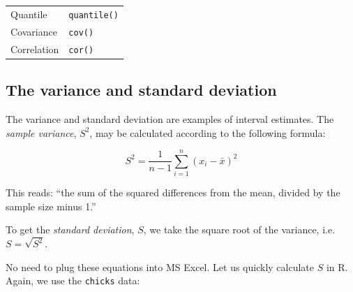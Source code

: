 \documentclass[english,10pt,a4paper,oneside]{book}
\newenvironment{Shaded}{\begin{snugshade}}{\end{snugshade}}
\newcommand{\DataTypeTok}[1]{\textcolor[rgb]{0.13,0.29,0.53}{#1}}
\newcommand{\KeywordTok}[1]{\textcolor[rgb]{0.13,0.29,0.53}{\textbf{#1}}}
\newcommand{\NormalTok}[1]{#1}
\newcommand{\OperatorTok}[1]{\textcolor[rgb]{0.81,0.36,0.00}{\textbf{#1}}}
\newcommand{\StringTok}[1]{\textcolor[rgb]{0.31,0.60,0.02}{#1}}
\theoremstyle{definition}
\theoremstyle{definition}
\theoremstyle{definition}
\theoremstyle{remark}
\begin{document}
\begin{longtable}[]{@{}ll@{}}
\begin{minipage}[t]{0.29\columnwidth}
Quantile\strut
\end{minipage} & \begin{minipage}[t]{0.29\columnwidth}\raggedright
\texttt{quantile()}\strut
\end{minipage}\tabularnewline
\begin{minipage}[t]{0.29\columnwidth}\raggedright
Covariance\strut
\end{minipage} & \begin{minipage}[t]{0.29\columnwidth}\raggedright
\texttt{cov()}\strut
\end{minipage}\tabularnewline
\begin{minipage}[t]{0.29\columnwidth}\raggedright
Correlation\strut
\end{minipage} & \begin{minipage}[t]{0.29\columnwidth}\raggedright
\texttt{cor()}\strut
\end{minipage}\tabularnewline
\bottomrule
\end{longtable}

\hypertarget{the-variance-and-standard-deviation}{%
\subsection{The variance and standard
deviation}\label{the-variance-and-standard-deviation}}

The variance and standard deviation are examples of interval estimates.
The \emph{sample variance}, \(S^{2}\), may be calculated according to
the following formula:

\[S^{2} = \frac{1}{n-1}\sum_{i=1}^{n}(x_{i}-\bar{x})^{2}\]

This reads: \enquote{the sum of the squared differences from the mean,
divided by the sample size minus 1.}

To get the \emph{standard deviation}, \(S\), we take the square root of
the variance, i.e. \(S = \sqrt{S^{2}}\).

No need to plug these equations into MS Excel. Let us quickly calculate
\(S\) in R. Again, we use the \texttt{chicks} data:

\begin{Shaded}
\end{Shaded}
\end{document}
